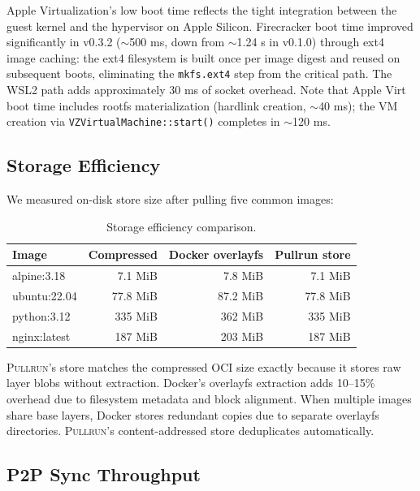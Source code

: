 \documentclass[11pt,a4paper]{article}
\newcommand{\pullrun}{\textsc{Pullrun}}
\begin{document}
Apple Virtualization's low boot time reflects the tight integration between the guest kernel and the hypervisor on Apple Silicon. Firecracker boot time improved significantly in v0.3.2 ($\sim$500 ms, down from $\sim$1.24 s in v0.1.0) through ext4 image caching: the ext4 filesystem is built once per image digest and reused on subsequent boots, eliminating the \texttt{mkfs.ext4} step from the critical path. The WSL2 path adds approximately 30 ms of socket overhead. Note that Apple Virt boot time includes rootfs materialization (hardlink creation, $\sim$40 ms); the VM creation via \texttt{VZVirtualMachine::start()} completes in $\sim$120 ms.

\subsection{Storage Efficiency}

We measured on-disk store size after pulling five common images:

\begin{table}[htbp]
    \centering
    \caption{Storage efficiency comparison.}
    \label{tab:storage}
    \begin{tabular}{@{}lrrr@{}}
        \toprule
        \textbf{Image} & \textbf{Compressed} & \textbf{Docker overlayfs} & \textbf{Pullrun store} \\
        \midrule
        alpine:3.18 & 7.1 MiB & 7.8 MiB & 7.1 MiB \\
        ubuntu:22.04 & 77.8 MiB & 87.2 MiB & 77.8 MiB \\
        python:3.12 & 335 MiB & 362 MiB & 335 MiB \\
        nginx:latest & 187 MiB & 203 MiB & 187 MiB \\
        \bottomrule
    \end{tabular}
\end{table}

\pullrun{}'s store matches the compressed OCI size exactly because it stores raw layer blobs without extraction. Docker's overlayfs extraction adds 10--15\% overhead due to filesystem metadata and block alignment. When multiple images share base layers, Docker stores redundant copies due to separate overlayfs directories. \pullrun{}'s content-addressed store deduplicates automatically.

\subsection{P2P Sync Throughput}
\end{document}
